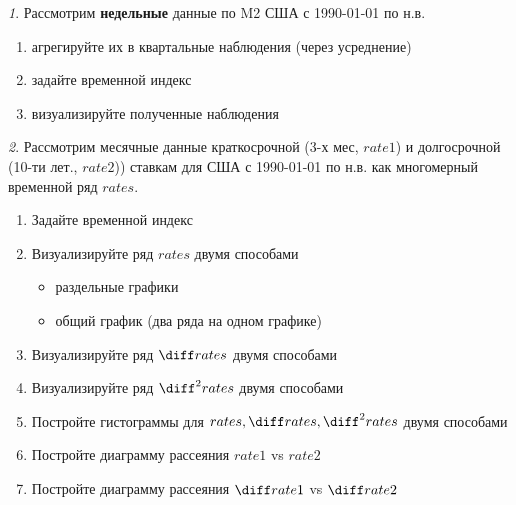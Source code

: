 \documentclass[12pt]{article}
\theoremstyle{remark}
\newtheorem{exercise}{}[subsection]
\begin{document}
\begin{exercise}
Рассмотрим \textbf{недельные} данные по M2 США с 1990-01-01 по н.в.
\begin{enumerate}
	\item агрегируйте их в квартальные наблюдения (через усреднение)
	\item задайте временной индекс
	\item визуализируйте полученные наблюдения 
\end{enumerate}
\end{exercise}

\begin{exercise}
Рассмотрим месячные данные краткосрочной (3-х мес, \(rate1\)) и долгосрочной (10-ти лет., \(rate2\)))
ставкам для США с 1990-01-01 по н.в. как многомерный временной ряд \(rates\).
\begin{enumerate}
	\item Задайте временной индекс
	\item Визуализируйте ряд \(rates\) двумя способами
	\begin{itemize}
		\item раздельные графики
		\item общий график (два ряда на одном графике)
	\end{itemize}
	\item Визуализируйте ряд \(\diff rates\) двумя способами
	\item Визуализируйте ряд \(\diff^2 rates\) двумя способами
	\item Постройте гистограммы для \(rates,\diff rates,\diff^2 rates\) двумя способами
	\item Постройте диаграмму рассеяния \(rate1\) vs \(rate2\)
	\item Постройте диаграмму рассеяния \(\diff rate1 \) vs \(\diff rate2\)
\end{enumerate}
\end{exercise}
\end{document}
